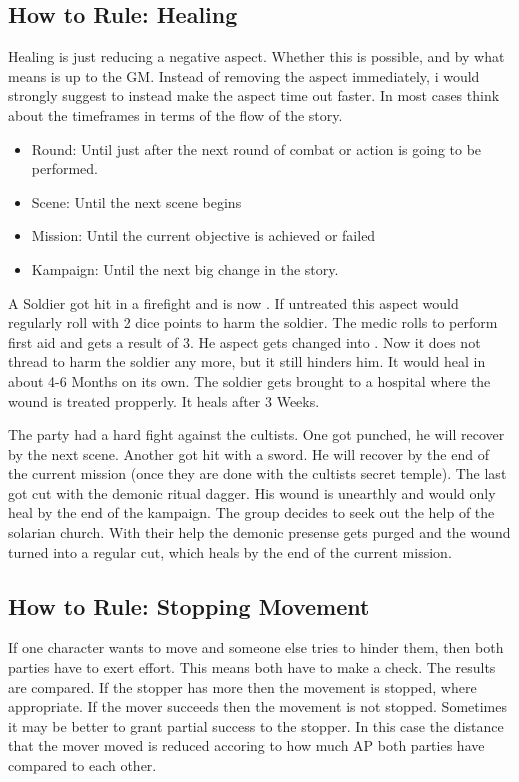 \documentclass[11pt]{article}
\begin{document}
{\subsection{How to Rule: Healing}
\label{sec:org131cc8d}
Healing is just reducing a negative aspect. Whether this is possible, and by what means is up to the GM. Instead of removing the aspect immediately, i would strongly suggest to instead make the aspect time out faster. In most cases think about the timeframes in terms of the flow of the story.
\begin{itemize}
\item Round: Until just after the next round of combat or action is going to be performed.
\item Scene: Until the next scene begins
\item Mission: Until the current objective is achieved or failed
\item Kampaign: Until the next big change in the story.
\end{itemize}

\begin{pwexample}
A Soldier got hit in a firefight and is now . If untreated this aspect would regularly roll with 2 dice points to harm the soldier. The medic rolls to perform first aid and gets a result of 3. He aspect gets changed into . Now it does not thread to harm the soldier any more, but it still hinders him. It would heal in about 4-6 Months on its own. The soldier gets brought to a hospital where the wound is treated propperly. It heals after 3 Weeks. 
\end{pwexample}

\begin{pwexample}
The party had a hard fight against the cultists. One got punched, he will recover by the next scene. Another got hit with a sword. He will recover by the end of the current mission (once they are done with the cultists secret temple). The last got cut with the demonic ritual dagger. His wound is unearthly and would only heal by the end of the kampaign. The group decides to seek out the help of the solarian church. With their help the demonic presense gets purged  and the wound turned into a regular cut, which heals by the end of the current mission.
\end{pwexample}

\subsection{How to Rule: Stopping Movement}
\label{sec:orgd8e51b3}
If one character wants to move and someone else tries to hinder them, then both parties have to exert effort. This means both have to make a check. The results are compared. If the stopper has more then the movement is stopped, where appropriate. If the mover succeeds then the movement is not stopped. Sometimes it may be better to grant partial success to the stopper. In this case the distance that the mover moved is reduced accoring to how much AP both parties have compared to each other.



}
\end{document}
